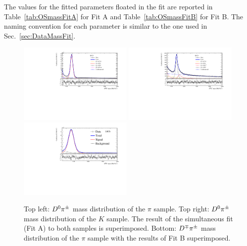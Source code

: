 The values for the fitted parameters floated in the fit are reported in Table~\ref{tab:OSmassFitA} for Fit A and Table~\ref{tab:OSmassFitB} for Fit B. The naming convention for each parameter is similar to the one used in Sec.~\ref{sec:DataMassFit}.

\begin{figure}[t]
	\begin{center}
		\includegraphics[width=0.49\textwidth]{AA-Appdx-OSTaggers/figs/MDFit_BeautyMass_Bu2D0Pi_withPulls.pdf}
		\includegraphics[width=0.49\textwidth]{AA-Appdx-OSTaggers/figs/MDFit_BeautyMass_Bu2D0K_withPulls.pdf} \\
		\includegraphics[width=0.49\textwidth]{AA-Appdx-OSTaggers/figs/MDFitForSWeights_BeautyMass_Bu2D0Pi.pdf}
	\end{center}
        \vspace{-2mm}
	\caption{Top left: $D^0\pi^\pm$ mass distribution of the $\pi$ sample. Top right: $D^0\pi^\pm$ mass distribution of the $K$ sample.
	The result of the simultaneous fit (Fit A) to both samples is superimposed.
	Bottom: $D^\mp\pi^\pm$ mass distribution of the $\pi$ sample with the results of Fit B superimposed.}
	\label{fig:OSmassFit}
\end{figure}

